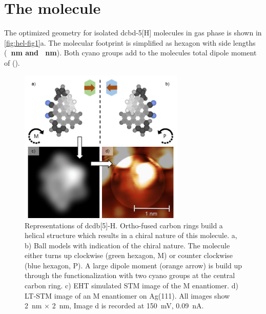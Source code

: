 \section{The molecule}
The optimized geometry for isolated dcbd-5[H] molecules in gas phase is shown in \autoref{fig:hel-fig1}a. The molecular footprint is simplified as hexagon with side lengths (\textbf{\color{red}\SI{}{\nano \meter} and \SI{}{\nano \meter}}). Both cyano groups add to the molecules total dipole moment of (\textbf{\color{red}\SI{}{\debye}}).
\begin{figure} \centering
	\includegraphics[width=0.7\textwidth]{./images/paper/helicene/fig1}
	\caption{Representations of dcdb[5]-H. Ortho-fused carbon rings build a helical structure which results in a chiral nature of this molecule. a, b) Ball models with indication of the chiral nature. The molecule either turns up clockwise (green hexagon, M) or counter clockwise (blue hexagon, P). A large dipole moment (orange arrow) is build up through the functionalization with two cyano groups at the central carbon ring. c) EHT simulated STM image of the M enantiomer. d) LT-STM image of an M enantiomer on Ag(111). All images show \SI{2}{\nano \meter} $\times$ \SI{2}{\nano \meter}, Image d is recorded at \SI{150}{\milli \volt}, \SI{0.09}{\nano \ampere}.}
	\label{fig:hel-fig1}
\end{figure}

